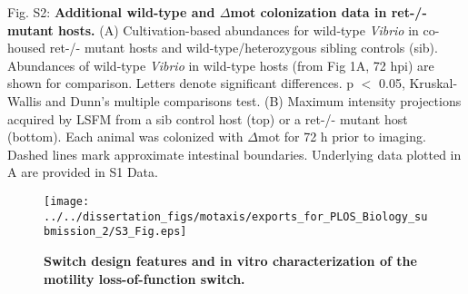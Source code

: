 Fig. S2: \textbf{Additional wild-type and $\Delta$mot colonization data in ret-/- mutant hosts.} (A) Cultivation-based abundances for wild-type \textit{Vibrio} in co-housed ret-/- mutant hosts and wild-type/heterozygous sibling controls (sib). Abundances of wild-type \textit{Vibrio} in wild-type hosts (from Fig 1A, 72 hpi) are shown for comparison. Letters denote significant differences. p $ < $ 0.05, Kruskal-Wallis and Dunn's multiple comparisons test. (B) Maximum intensity projections acquired by LSFM from a sib control host (top) or a ret-/- mutant host (bottom). Each animal was colonized with $\Delta$mot for 72 h prior to imaging. Dashed lines mark approximate intestinal boundaries. Underlying data plotted in A are provided in S1 Data.

\newpage

\begin{figure}[h!]
	\centerline{
		\texttt{[image: ../../dissertation\_figs/motaxis/exports\_for\_PLOS\_Biology\_submission\_2/S3\_Fig.eps]}}
	\caption{\textbf{Switch design features and in vitro characterization of the motility loss-of-function switch.}}
\end{figure}
		
